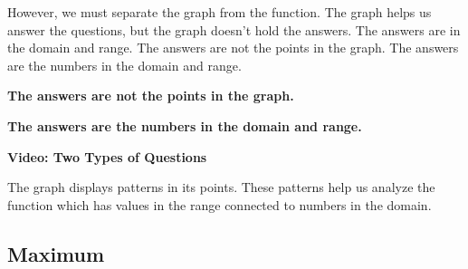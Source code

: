\documentclass{ximera}
\begin{document}
However, we must separate the graph from the function.  The graph helps us answer the questions, but the graph doesn't hold the answers.  The answers are in the domain and range.  The answers are not the points in the graph.  The answers are the numbers in the domain and range.



\begin{center}

\textbf{\textcolor{blue!55!black}{The answers are not the points in the graph.}} 

\textbf{\textcolor{blue!55!black}{The answers are the numbers in the domain and range.}}

\end{center}







\begin{explanation} \textbf{\textcolor{red!75!green}{Video: Two Types of Questions}}



\begin{onlineOnly}
\begin{expandable} 

\begin{center}
\end{center}

\end{expandable}
\end{onlineOnly}

\end{explanation}









The graph displays patterns in its points.  These patterns help us analyze the function which has values in the range connected to numbers in the domain.




\subsection*{Maximum}
\end{document}
